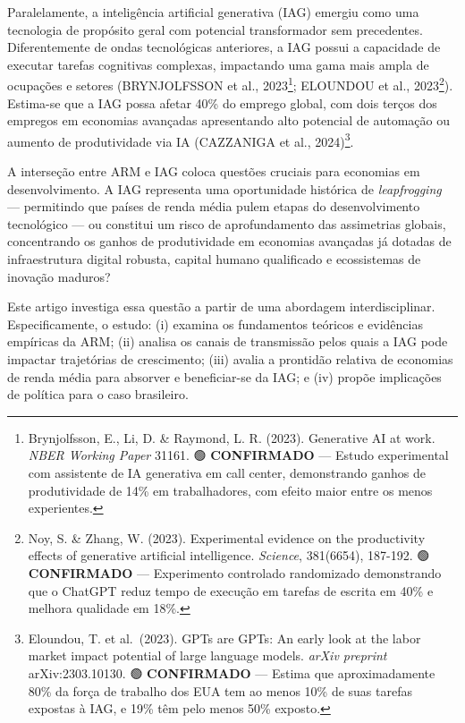 \documentclass[
  brazilian,
  12pt,
]{article}
\begin{document}
Paralelamente, a inteligência artificial generativa (IAG) emergiu como uma tecnologia de propósito geral com potencial transformador sem precedentes. Diferentemente de ondas tecnológicas anteriores, a IAG possui a capacidade de executar tarefas cognitivas complexas, impactando uma gama mais ampla de ocupações e setores (BRYNJOLFSSON et al., 2023\footnote{Brynjolfsson, E., Li, D. \& Raymond, L. R. (2023). Generative AI at work. \emph{NBER Working Paper} 31161. 🟢 \textbf{CONFIRMADO} --- Estudo experimental com assistente de IA generativa em call center, demonstrando ganhos de produtividade de 14\% em trabalhadores, com efeito maior entre os menos experientes.}; ELOUNDOU et al., 2023\footnote{Noy, S. \& Zhang, W. (2023). Experimental evidence on the productivity effects of generative artificial intelligence. \emph{Science}, 381(6654), 187-192. 🟢 \textbf{CONFIRMADO} --- Experimento controlado randomizado demonstrando que o ChatGPT reduz tempo de execução em tarefas de escrita em 40\% e melhora qualidade em 18\%.}). Estima-se que a IAG possa afetar 40\% do emprego global, com dois terços dos empregos em economias avançadas apresentando alto potencial de automação ou aumento de produtividade via IA (CAZZANIGA et al., 2024)\footnote{Eloundou, T. et al.~(2023). GPTs are GPTs: An early look at the labor market impact potential of large language models. \emph{arXiv preprint} arXiv:2303.10130. 🟢 \textbf{CONFIRMADO} --- Estima que aproximadamente 80\% da força de trabalho dos EUA tem ao menos 10\% de suas tarefas expostas à IAG, e 19\% têm pelo menos 50\% exposto.}.

A interseção entre ARM e IAG coloca questões cruciais para economias em desenvolvimento. A IAG representa uma oportunidade histórica de \emph{leapfrogging} --- permitindo que países de renda média pulem etapas do desenvolvimento tecnológico --- ou constitui um risco de aprofundamento das assimetrias globais, concentrando os ganhos de produtividade em economias avançadas já dotadas de infraestrutura digital robusta, capital humano qualificado e ecossistemas de inovação maduros?

Este artigo investiga essa questão a partir de uma abordagem interdisciplinar. Especificamente, o estudo: (i) examina os fundamentos teóricos e evidências empíricas da ARM; (ii) analisa os canais de transmissão pelos quais a IAG pode impactar trajetórias de crescimento; (iii) avalia a prontidão relativa de economias de renda média para absorver e beneficiar-se da IAG; e (iv) propõe implicações de política para o caso brasileiro.
\end{document}
